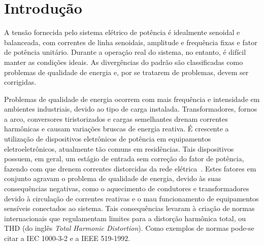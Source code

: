 
\chapter{Introdução}\label{introducao}


	A tensão fornecida pelo sistema elétrico de potência é idealmente senoidal e
	balanceada, com correntes de linha senoidais, amplitude e frequência fixas e
	fator de potência unitário. Durante a operação real do sistema, no entanto,
	é difícil manter as condições ideais. As divergências do padrão são classificadas
	como problemas de qualidade de energia e, por se tratarem de problemas, devem
	ser corrigidas.

	Problemas de qualidade de energia ocorrem com mais frequência e intensidade em
	ambientes industriais, devido ao tipo de carga instalada. Transformadores,
	fornos a arco, conversores tiristorizados e cargas semelhantes drenam correntes
	harmônicas e causam variações bruscas de energia reativa. É crescente a
	utilização de dispositivos eletrônicos de potência em equipamentos
	eletroeletrônicos, atualmente tão comuns em residências. Tais dispositivos possuem,
	em geral, um estágio de entrada sem correção do fator de potência, fazendo com que
	drenem correntes distorcidas da rede elétrica~\cite{ref:MANSOOR}. Estes fatores em
	conjunto agravam o problema de qualidade de energia, devido às suas consequências
	negativas, como	o aquecimento de condutores e transformadores devido à circulação
	de correntes reativas e o mau funcionamento de equipamentos sensíveis conectados
	ao sistema.	Tais consequências levaram à criação de normas internacionais que
	regulamentam limites para a distorção harmônica total, ou THD (do inglês \emph{
	Total Harmonic Distortion}). Como exemplos de normas pode-se citar a IEC 1000-3-2
	e a IEEE 519-1992.

